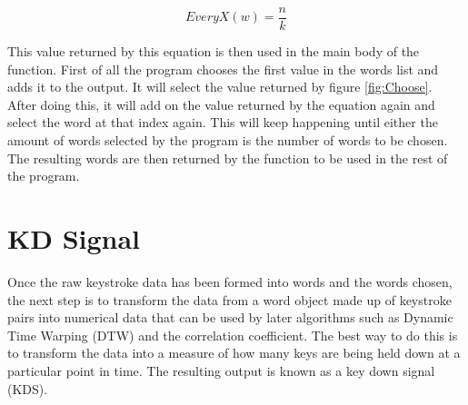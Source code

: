 \documentclass[10pt,a4paper]{report}
\begin{document}
\begin{equation}
\textit{EveryX}(w) = \frac{n}{k}
\label{fig:Choose}
\end{equation}

This value returned by this equation is then used in the main body of the function. First of all the program chooses the first value in the words list and adds it to the output. It will select the value returned by figure \ref{fig:Choose}. After doing this, it will add on the value returned by the equation again and select the word at that index again. This will keep happening until either the amount of words selected by the program is the number of words to be chosen. The resulting words are then returned by the function to be used in the rest of the program. 

\section{KD Signal}
Once the raw keystroke data has been formed into words and the words chosen, the next step is to transform the data from a word object made up of keystroke pairs into numerical data that can be used by later algorithms such as Dynamic Time Warping (DTW) and the correlation coefficient. The best way to do this is to transform the data into a measure of how many keys are being held down at a particular point in time. The resulting output is known as a key down signal (KDS). \cite{ToosiRamin2021Taok}
\end{document}
